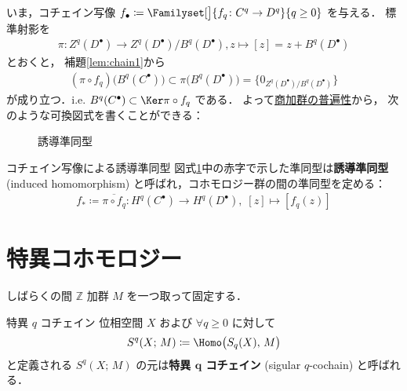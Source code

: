 \documentclass[algtopo_main]{subfiles}
\begin{document}
いま，コチェイン写像 $f_\bullet \coloneqq \Familyset[\big]{f_q \colon C^q \to D^q}{q \ge 0}$ を与える．
標準射影を
\begin{align}
    \pi \colon Z^q(D^\bullet) \to Z^q(D^\bullet) / B^q(D^\bullet), z \mapsto [z] = z + B^q(D^\bullet)
\end{align}
とおくと，
補題\ref{lem:chain1}から
\begin{align}
    (\pi\circ f_q)\bigl( B^q(C^\bullet)\bigr) \subset \pi \bigl( B^q(D^\bullet) \bigr) = \{0_{Z^q(D^\bullet)/B^q(D^\bullet)} \}
\end{align}
が成り立つ．i.e. $B^q(C^\bullet) \subset \Ker \pi\circ f_q$ である．
よって\hyperref[lem:quomod-univ]{商加群の普遍性}から，
次のような可換図式を書くことができる：
\begin{figure}[H]
    \centering
    \caption{誘導準同型}
    \label{fig:induced-cohom}
\end{figure}%

\begin{mydef}[label=def:induced-cochain]{コチェイン写像による誘導準同型}
    図式\ref{fig:induced-cohom}中の赤字で示した準同型は\textbf{誘導準同型} (induced homomorphism) と呼ばれ，コホモロジー群の間の準同型を定める：
    \begin{align}
        f_* \coloneqq \overline{\pi \circ f_q} \colon H^q(C^\bullet) \to H^q(D^\bullet),\; [z] \mapsto [f_q(z)]
    \end{align}
\end{mydef}

\section{特異コホモロジー}

しばらくの間 $\mathbb{Z}$ 加群 $M$ を一つ取って固定する．
\begin{mydef}[label=def:singularcochain]{特異 $q$ コチェイン}
    位相空間 $X$ および $\forall q \ge 0$ に対して
    \begin{align}
        S^q(X;\, M) \coloneqq \Homo \bigl( S_q(X),\, M \bigr) 
    \end{align}
    と定義される $S^q(X;\, M)$ の元は\textbf{特異 $\bm{q}$ コチェイン} (sigular $q$-cochain) と呼ばれる．
\end{mydef}
\end{document}
